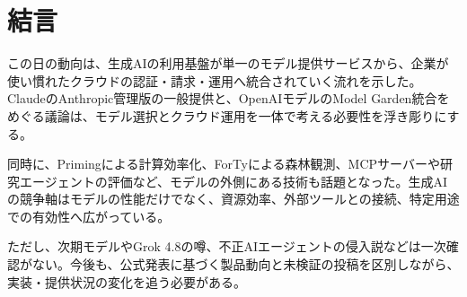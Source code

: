 \section*{結言}
この日の動向は、生成AIの利用基盤が単一のモデル提供サービスから、企業が使い慣れたクラウドの認証・請求・運用へ統合されていく流れを示した。ClaudeのAnthropic管理版の一般提供と、OpenAIモデルのModel Garden統合をめぐる議論は、モデル選択とクラウド運用を一体で考える必要性を浮き彫りにする。

同時に、Primingによる計算効率化、ForTyによる森林観測、MCPサーバーや研究エージェントの評価など、モデルの外側にある技術も話題となった。生成AIの競争軸はモデルの性能だけでなく、資源効率、外部ツールとの接続、特定用途での有効性へ広がっている。

ただし、次期モデルやGrok 4.8の噂、不正AIエージェントの侵入説などは一次確認がない。今後も、公式発表に基づく製品動向と未検証の投稿を区別しながら、実装・提供状況の変化を追う必要がある。
